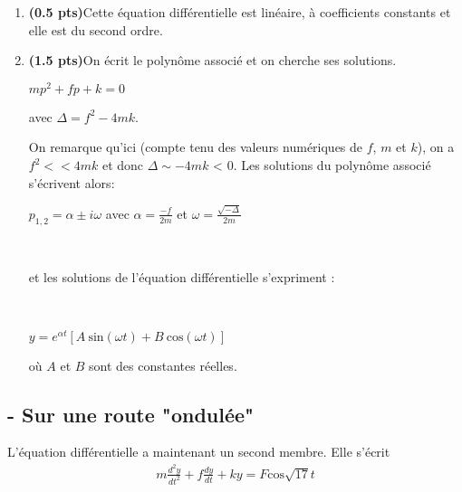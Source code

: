 \documentclass[fleqn]{article}
\begin{document}
\begin{enumerate}
\item \textbf{(0.5 pts)}Cette \'equation diff\'erentielle est lin\'eaire, \`a coefficients constants et elle est du second ordre.
\item \textbf{(1.5 pts)}{On \'ecrit le polyn\^ome associ\'e et on cherche ses solutions.}
\begin{center}
{$mp^{2}+fp+k=0$ }

{avec $\Delta= f^2-4mk$.}
\end{center}

{On remarque qu'ici (compte tenu des valeurs num\'eriques de $f$, $m$ et $k$), on a $f^{2} << 4mk$ et donc $\Delta \sim -4mk$ < 0. Les solutions du polyn\^ome associ\'e s'\'ecrivent alors:}

\begin{center}
{ $p_{1,2} = \alpha \pm i \omega$   avec $\alpha= \frac{- f}{2m}$ et $\omega =\frac{\sqrt{-\Delta}}{2m}$}

\

{et les solutions de l'\'equation diff\'erentielle s'expriment :}

\

{$y= e^{\alpha t} [A\  \text{sin}(\omega t) + B\  \text{cos} (\omega t)]$}  


{o\`u $A$ et $B$ sont des constantes r\'eelles. } 
\end{center}
\end{enumerate}


\subsection{- Sur une route "ondul\'ee"}


L'\'equation diff\'erentielle a maintenant un second membre. Elle s'\'ecrit 
\begin{align*}
m\frac{d^{2}y}{dt^{2}}+f \frac{dy}{dt} +ky = F\text{cos} \sqrt{17}t
\end{align*}
\end{document}
